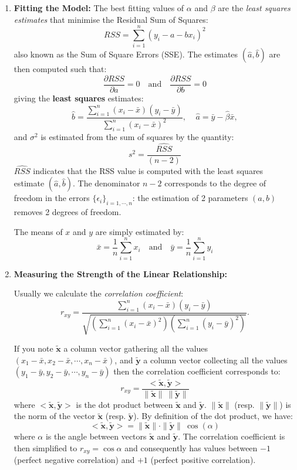 \documentclass[a4paper,11pt,oneside,onecolumn]{book}
\begin{document}
\begin{enumerate}
\item {\bf Fitting the Model:} The best fitting values of $\alpha$ and
$\beta$ are the {\it least squares estimates} that minimise the Residual Sum of
Squares: 
$$
RSS =\sum_{i=1}^n (y_i - a - b x_i)^2
$$ 
also known as the Sum of Square Errors (SSE).
 The estimates $(\hat{a},\hat{b})$ are then computed such that:
$$
\frac{\partial RSS}{\partial a} =0 \quad \text{and} \quad
\frac{\partial RSS}{\partial b} =0  
$$
giving the \textbf{least squares} estimates:
\begin{equation}
 \hat{b} = \frac{\sum_{i=1}^n (x_i - \bar{x})(y_i - \bar{y})}{\sum_{i=1}^n (x_i - \bar{x})^2}, \;\;\;\;
\hat{a} = \bar{y} - \hat{\beta} \bar{x},
\label{eq:LS0}
\end{equation}
and $\sigma^2$ is
estimated from the sum of squares by the quantity: 
$$
s^2 =\frac{\widehat{RSS}}{(n-2)}
$$
$\widehat{RSS}$ indicates that the RSS value is computed with the least squares estimate $(\hat{a},\hat{b})$.
The denominator $n-2$ corresponds to the degree of freedom in the errors $\lbrace \epsilon_i\rbrace_{i=1,\cdots,n}$: the estimation of 2 parameters 
$(a,b)$ removes 2 degrees of freedom.



The means of $x$ and $y$ are simply estimated by:
$$
\bar{x}=\frac{1}{n}\sum_{i=1}^n x_i \quad \text{and} \quad \bar{y}=\frac{1}{n}\sum_{i=1}^n y_i 
$$

\item {\bf Measuring the Strength of the Linear Relationship:} 
\begin{definition}

Usually we calculate the {\it correlation coefficient}:
\[ r_{xy} = \frac{\sum_{i=1}^n (x_i - \bar{x})(y_i -
\bar{y})}{\sqrt{\left( \sum_{i=1}^n (x_i - \bar{x})^2 \right) \left(
\sum_{i=1}^n (y_i - \bar{y})^2 \right)}}. \] 
\end{definition}

If you note $\mathbf{\tilde{x}}$ a column vector gathering all the values $(x_1-\bar{x},x_2-\bar{x}, \cdots,x_n-\bar{x})$, and $\mathbf{\tilde{y}}$ a column vector collecting all the values $(y_1-\bar{y},y_2-\bar{y},\cdots,y_n-\bar{y})$ then the correlation coefficient corresponds to:
$$ 
r_{xy} =\frac{<\mathbf{\tilde{x}},\mathbf{\tilde{y}}>}{\|\mathbf{\tilde{x}}\|\ \|\mathbf{\tilde{y}}\|}
$$
where $<\mathbf{\tilde{x}},\mathbf{\tilde{y}}>$ is the dot product between  $\mathbf{\tilde{x}}$ and $\mathbf{\tilde{y}}$. $\|\mathbf{\tilde{x}}\|$ (resp. $\|\mathbf{\tilde{y}}\|$) is the norm of the vector $\mathbf{\tilde{x}}$ (resp. $\mathbf{\tilde{y}}$). By definition of the dot product, we have:
$$
<\mathbf{\tilde{x}},\mathbf{\tilde{y}}> =\|\mathbf{\tilde{x}}\|\cdot\|\mathbf{\tilde{y}}\|  \ \cos( \alpha )
$$
where $\alpha$ is the angle between vectors  $\mathbf{\tilde{x}}$  and $\mathbf{\tilde{y}}$. The correlation coefficient is then simplified to $r_{xy} =\cos\alpha$ and consequently has values between $-1$ (perfect negative correlation) and $+1$ (perfect positive correlation). 



\end{enumerate}
\end{document}
